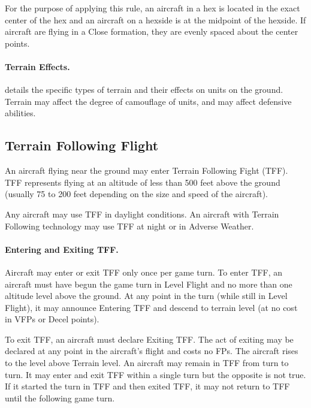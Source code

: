 For the purpose of applying this rule, an aircraft in a hex is located in the exact center of the hex and an aircraft on a hexside is at the midpoint of the hexside. If aircraft are flying in a Close formation, they are evenly spaced about the center points.


\paragraph{Terrain Effects\protect{}.}  details the specific types of terrain and their effects on units on the ground. Terrain may affect the degree of camouflage of units, and may affect defensive abilities.

\subsection{Terrain Following Flight}

An aircraft flying near the ground may enter Terrain Following Fight (TFF). TFF represents flying at an altitude of less than 500 feet above the ground (usually 75 to 200 feet depending on the size and speed of the aircraft).

Any aircraft may use TFF in daylight conditions. An aircraft with Terrain Following technology may use TFF at night or in Adverse Weather.

\paragraph{Entering and Exiting TFF.} Aircraft may enter or exit TFF only once per game turn. To enter TFF, an aircraft must have begun the game turn in Level Flight and no more than one altitude level above the ground. At any point in the turn (while still in Level Flight), it may announce Entering TFF and descend to terrain level (at no cost in VFPs or Decel points).

To exit TFF, an aircraft must declare Exiting TFF. The act of exiting may be declared at any point in the aircraft's flight and costs no FPs. The aircraft rises to the level above Terrain level. An aircraft may remain in TFF from turn to turn. It may enter and exit TFF within a single turn but the opposite is not true.  If it started the turn in TFF and then exited TFF, it may not return to TFF until the following game turn. 

